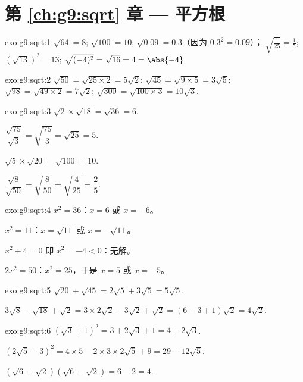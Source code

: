 \section*{第 \ref{ch:g9:sqrt} 章 --- 平方根}

\begin{solution}{exo:g9:sqrt:1}
$\sqrt{64} = 8$; \quad $\sqrt{100} = 10$; \quad
$\sqrt{0.09} = 0.3$（因为 $0.3^2 = 0.09$）； \quad
$\sqrt{\frac{1}{25}} = \frac15$; \quad
$\left(\sqrt{13}\right)^2 = 13$; \quad
$\sqrt{(-4)^2} = \sqrt{16} = 4 = \abs{-4}$.
\end{solution}

\begin{solution}{exo:g9:sqrt:2}
$\sqrt{50} = \sqrt{25 \times 2} = 5\sqrt2$; \quad
$\sqrt{45} = \sqrt{9 \times 5} = 3\sqrt5$; \quad
$\sqrt{98} = \sqrt{49 \times 2} = 7\sqrt2$; \quad
$\sqrt{300} = \sqrt{100 \times 3} = 10\sqrt3$.
\end{solution}

\begin{solution}{exo:g9:sqrt:3}
$\sqrt2 \times \sqrt{18} = \sqrt{36} = 6$.

$\dfrac{\sqrt{75}}{\sqrt3} = \sqrt{\dfrac{75}{3}} = \sqrt{25} = 5$.

$\sqrt5 \times \sqrt{20} = \sqrt{100} = 10$.

$\dfrac{\sqrt8}{\sqrt{50}} = \sqrt{\dfrac{8}{50}} = \sqrt{\dfrac{4}{25}}
= \dfrac25$.
\end{solution}

\begin{solution}{exo:g9:sqrt:4}
$x^2 = 36$：$x = 6$ 或 $x = -6$。

$x^2 = 11$：$x = \sqrt{11}$ 或 $x = -\sqrt{11}$。

$x^2 + 4 = 0$ 即 $x^2 = -4 < 0$：无解。

$2x^2 = 50$：$x^2 = 25$，于是 $x = 5$ 或 $x = -5$。
\end{solution}

\begin{solution}{exo:g9:sqrt:5}
$\sqrt{20} + \sqrt{45} = 2\sqrt5 + 3\sqrt5 = 5\sqrt5$.

$3\sqrt8 - \sqrt{18} + \sqrt2 = 3 \times 2\sqrt2 - 3\sqrt2 + \sqrt2
= (6 - 3 + 1)\sqrt2 = 4\sqrt2$.
\end{solution}

\begin{solution}{exo:g9:sqrt:6}
$\left(\sqrt3 + 1\right)^2 = 3 + 2\sqrt3 + 1 = 4 + 2\sqrt3$.

$\left(2\sqrt5 - 3\right)^2 = 4 \times 5 - 2 \times 3 \times 2\sqrt5 + 9
= 29 - 12\sqrt5$.

$\left(\sqrt6 + \sqrt2\right)\left(\sqrt6 - \sqrt2\right) = 6 - 2 = 4$.
\end{solution}

